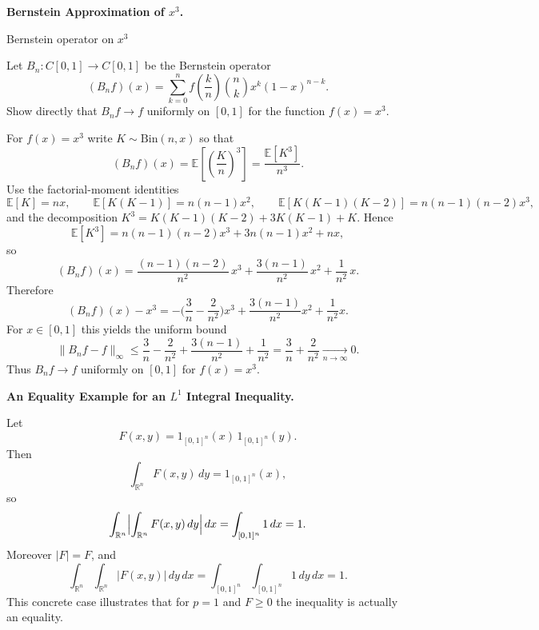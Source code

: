\begin{problem}[CP-II-0220]
\label{prob:cp-ii-0220}
\textbf{Bernstein Approximation of \(x^3\).}

\hspace*{1.5em}Bernstein operator on $x^3$

Let $B_n:C[0,1]\to C[0,1]$ be the Bernstein operator
\[
(B_n f)(x)=\sum_{k=0}^{n} f\!\left(\frac{k}{n}\right)\binom{n}{k}x^{k}(1-x)^{n-k}.
\]
Show directly that $B_n f\to f$ uniformly on $[0,1]$ for the function $f(x)=x^3$.
\end{problem}

\begin{solution}
For $f(x)=x^3$ write $K\sim\mathrm{Bin}(n,x)$ so that
\[
(B_n f)(x)=\mathbb{E}\!\left[\left(\frac{K}{n}\right)^3\right]
=\frac{\mathbb{E}[K^3]}{n^3}.
\]
Use the factorial-moment identities
\[
\mathbb{E}[K]=nx,\qquad
\mathbb{E}[K(K-1)]=n(n-1)x^2,\qquad
\mathbb{E}[K(K-1)(K-2)]=n(n-1)(n-2)x^3,
\]
and the decomposition \(K^3=K(K-1)(K-2)+3K(K-1)+K\). Hence
\[
\mathbb{E}[K^3]=n(n-1)(n-2)x^3+3n(n-1)x^2+nx,
\]
so
\[
(B_n f)(x)=\frac{(n-1)(n-2)}{n^2}\,x^3+\frac{3(n-1)}{n^2}\,x^2+\frac{1}{n^2}\,x.
\]
Therefore
\[
(B_n f)(x)-x^3
= -\Big(\frac{3}{n}-\frac{2}{n^2}\Big)x^3+\frac{3(n-1)}{n^2}x^2+\frac{1}{n^2}x.
\]
For $x\in[0,1]$ this yields the uniform bound
\[
\|B_n f-f\|_\infty
\le \frac{3}{n}-\frac{2}{n^2}+\frac{3(n-1)}{n^2}+\frac{1}{n^2}
= \frac{3}{n}+\frac{2}{n^2}\xrightarrow[n\to\infty]{}0.
\]
Thus $B_n f\to f$ uniformly on $[0,1]$ for $f(x)=x^3$.
\end{solution}

\begin{problem}[CP-II-0221]
\label{prob:cp-ii-0221}
\textbf{An Equality Example for an \(L^1\) Integral Inequality.}

\hspace*{1.5em}Let
\[
F(x,y) = 1_{[0,1]^n}(x)\,1_{[0,1]^n}(y).
\]
Then
\[
\int_{\mathbb{R}^n} F(x,y)\,dy = 1_{[0,1]^n}(x),
\]
so
\[
\int_{\mathbb{R}^n}
\Bigl|\int_{\mathbb{R}^n} F(x,y)\,dy\Bigr|\,dx
= \int_{[0,1]^n} 1\,dx = 1.
\]
Moreover $|F|=F$, and
\[
\int_{\mathbb{R}^n}\int_{\mathbb{R}^n} |F(x,y)|\,dy\,dx
= \int_{[0,1]^n}\int_{[0,1]^n} 1\,dy\,dx
= 1.
\]
This concrete case illustrates that for $p=1$ and $F\ge0$ the inequality
is actually an equality.
\end{problem}

